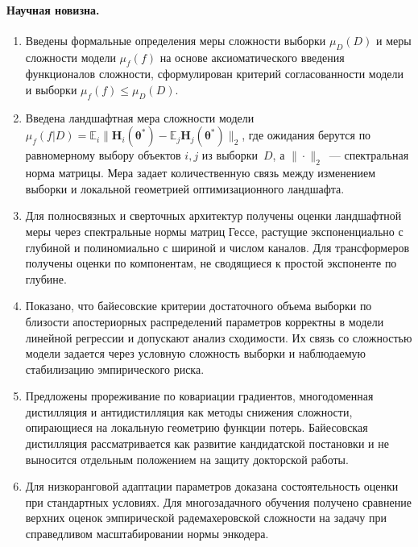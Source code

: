 \paragraph{Научная новизна.}
\begin{enumerate}
    \item Введены формальные определения меры сложности выборки $\mu_D(D)$ и меры сложности модели $\mu_f(f)$ на основе аксиоматического введения функционалов сложности, сформулирован критерий согласованности модели и выборки $\mu_f(f) \le \mu_D(D)$.
    \item Введена ландшафтная мера сложности модели $\mu_f(f|D) = \mathbb{E}_{i}\big\|\mathbf{H}_{i}(\boldsymbol{\theta}^*)-\mathbb{E}_{j}\mathbf{H}_{j}(\boldsymbol{\theta}^*)\big\|_2$, где ожидания берутся по равномерному выбору объектов $i,j$ из выборки~$D$, а $\|\cdot\|_2$~--- спектральная норма матрицы. Мера задает количественную связь между изменением выборки и локальной геометрией оптимизационного ландшафта.
    \item Для полносвязных и сверточных архитектур получены оценки ландшафтной меры через спектральные нормы матриц Гессе, растущие экспоненциально с глубиной и полиномиально с шириной и числом каналов. Для трансформеров получены оценки по компонентам, не сводящиеся к простой экспоненте по глубине.
    \item Показано, что байесовские критерии достаточного объема выборки по близости апостериорных распределений параметров корректны в модели линейной регрессии и допускают анализ сходимости. Их связь со сложностью модели задается через условную сложность выборки и наблюдаемую стабилизацию эмпирического риска.
    \item Предложены прореживание по ковариации градиентов, многодоменная дистилляция и антидистилляция как методы снижения сложности, опирающиеся на локальную геометрию функции потерь. Байесовская дистилляция рассматривается как развитие кандидатской постановки и не выносится отдельным положением на защиту докторской работы.
    \item Для низкоранговой адаптации параметров доказана состоятельность оценки при стандартных условиях. Для многозадачного обучения получено сравнение верхних оценок эмпирической радемахеровской сложности на задачу при справедливом масштабировании нормы энкодера.
\end{enumerate}


